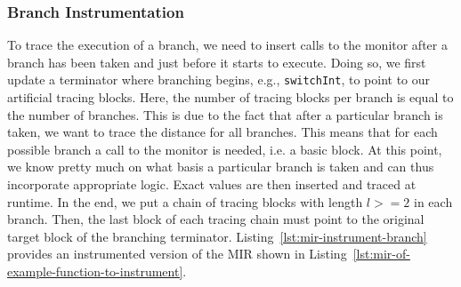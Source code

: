 \documentclass{article}
\begin{document}
\subsubsection{Branch Instrumentation}
To trace the execution of a branch, we need to insert calls to the monitor after a branch has been taken and just before it starts to execute. Doing so, we first update a terminator where branching begins, e.g., \lstinline{switchInt}, to point to our artificial tracing blocks. Here, the number of tracing blocks per branch is equal to the number of branches. This is due to the fact that after a particular branch is taken, we want to trace the distance for all branches. This means that for each possible branch a call to the monitor is needed, i.e. a basic block. At this point, we know pretty much on what basis a particular branch is taken and can thus incorporate appropriate logic. Exact values are then inserted and traced at runtime. In the end, we put a chain of tracing blocks with length $l >= 2$ in each branch. Then, the last block of each tracing chain must point to the original target block of the branching terminator. Listing~\ref{lst:mir-instrument-branch} provides an instrumented version of the \ac{MIR} shown in Listing~\ref{lst:mir-of-example-function-to-instrument}.
\end{document}
